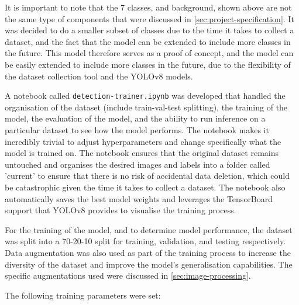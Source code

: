 It is important to note that the 7 classes, and background, shown above are not the same type of components that were discussed in \autoref{sec:project-specification}. It was decided to do a smaller subset of classes due to the time it takes to collect a dataset, and the fact that the model can be extended to include more classes in the future. This model therefore serves as a proof of concept, and the model can be easily extended to include more classes in the future, due to the flexibility of the dataset collection tool and the YOLOv8 models.

A notebook called \texttt{detection-trainer.ipynb} was developed that handled the organisation of the dataset (include train-val-test splitting), the training of the model, the evaluation of the model, and the ability to run inference on a particular dataset to see how the model performs. The notebook makes it incredibly trivial to adjust hyperparameters and change specifically what the model is trained on. The notebook ensures that the original dataset remains untouched and organises the desired images and labels into a folder called 'current' to ensure that there is no risk of accidental data deletion, which could be catastrophic given the time it takes to collect a dataset. The notebook also automatically saves the best model weights and leverages the TensorBoard support that YOLOv8 provides to visualise the training process.

For the training of the model, and to determine model performance, the dataset was split into a 70-20-10 split for training, validation, and testing respectively. Data augmentation was also used as part of the training process to increase the diversity of the dataset and improve the model's generalisation capabilities. The specific augmentations used were discussed in \autoref{sec:image-processing}. 

The following training parameters were set:

